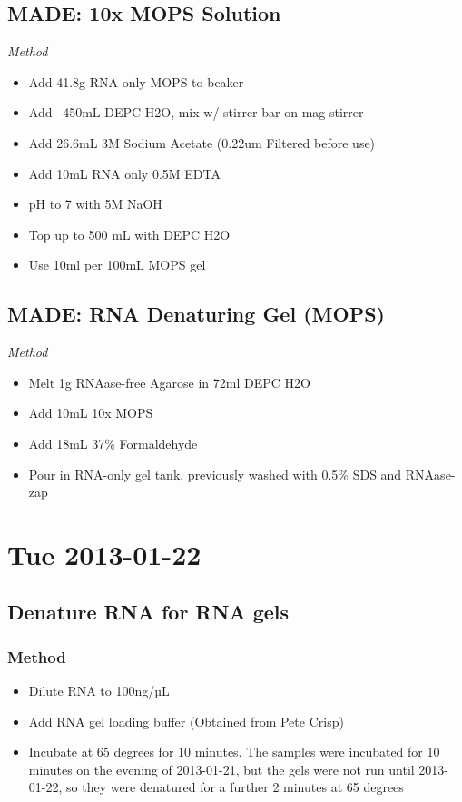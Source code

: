 \documentclass[12pt,a4paper]{book}
\begin{document}
  \section*{MADE: 10x MOPS Solution}
    \emph{Method}
    \begin{itemize} \itemsep1pt \parskip0pt 
      \item Add 41.8g RNA only MOPS to beaker
      \item Add ~450mL DEPC H2O, mix w/ stirrer bar on mag stirrer
      \item Add 26.6mL 3M Sodium Acetate (0.22um Filtered before use)
      \item Add 10mL RNA only 0.5M EDTA
      \item pH to 7 with 5M NaOH
      \item Top up to 500 mL with DEPC H2O
      \item Use 10ml per 100mL MOPS gel
    \end{itemize}

  \section*{MADE: RNA Denaturing Gel (MOPS)}
    \emph{Method}
    \begin{itemize} \itemsep1pt \parskip0pt 
      \item Melt 1g RNAase-free Agarose in 72ml DEPC H2O
      \item Add 10mL 10x MOPS
      \item Add 18mL 37\% Formaldehyde
      \item Pour in RNA-only gel tank, previously washed with 0.5\% SDS and RNAase-zap
    \end{itemize}

\chapter*{Tue 2013-01-22}
  \section*{Denature RNA for RNA gels}
    \subsection*{Method}
      \begin{itemize} \itemsep1pt \parskip0pt 
        \item Dilute RNA to 100ng/µL
        \item Add RNA gel loading buffer (Obtained from Pete Crisp)
        \item Incubate at 65 degrees for 10 minutes. The samples were incubated for 10 minutes on the evening of
          2013-01-21, but the gels were not run until 2013-01-22, so they were denatured for a further 2 minutes at 65
          degrees
      \end{itemize}
\end{document}
